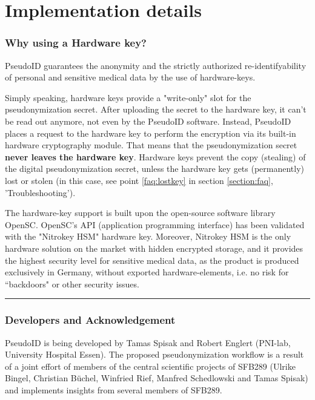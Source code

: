 
\section{Implementation details}
\label{section:implementation}
\subsubsection*{Why using a Hardware key?}

PseudoID guarantees the anonymity and the strictly authorized re-identifyability of personal and sensitive medical data by the use of hardware-keys.

Simply speaking, hardware keys provide a "write-only" slot for the pseudonymization secret. After uploading the secret to the hardware key, it can't be read out anymore, not even by the PseudoID software. Instead, PseudoID places a request to the hardware key to perform the encryption via its built-in hardware cryptography module. That means that the pseudonymization secret \textbf{never leaves the hardware key}. Hardware keys prevent the copy (stealing) of the digital pseudonymization secret, unless the hardware key gets (permanently) lost or stolen (in this case, see point \ref{faq:lostkey} in section \ref{section:faq}, 'Troubleshooting').

The hardware-key support is built upon the open-source software library OpenSC. OpenSC's API (application programming interface) has been validated with the "Nitrokey HSM" hardware key. Moreover, Nitrokey HSM is the only hardware solution on the market with hidden encrypted storage, and it provides the highest security level for sensitive medical data, as the product is produced exclusively in Germany, without exported hardware-elements, i.e. no risk for “backdoors" or other security issues.

\par\noindent\rule{\textwidth\color{pniblue}}{0.4pt}
\subsubsection*{Developers and Acknowledgement}

PseudoID is being developed by Tamas Spisak and Robert Englert (PNI-lab, University Hospital Essen). The proposed pseudonymization workflow is a result of a joint effort of members of the central scientific projects of SFB289 (Ulrike Bingel, Christian Büchel, Winfried Rief, Manfred Schedlowski and Tamas Spisak) and implements insights from several members of SFB289.